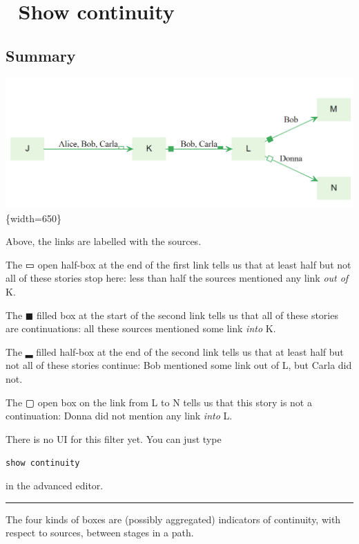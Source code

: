 \documentclass[
]{book}
\begin{document}
\hypertarget{show-continuity}{%
\section{🧪 Show continuity}\label{show-continuity}}

\hypertarget{summary-4}{%
\subsection{Summary}\label{summary-4}}

\includegraphics[width=6.77083in,height=\textheight]{_assets/image-20211222121147473.png}\{width=650\}

Above, the links are labelled with the sources.

The ▭ open half-box at the end of the first link tells us that at least half but not all of these stories stop here: less than half the sources mentioned any link \emph{out of} K.

The ◼ filled box at the start of the second link tells us that all of these stories are continuations: all these sources mentioned some link \emph{into} K.

The ▂ filled half-box at the end of the second link tells us that at least half but not all of these stories continue: Bob mentioned some link out of L, but Carla did not.

The ▢ open box on the link from L to N tells us that this story is not a continuation: Donna did not mention any link \emph{into} L.

There is no UI for this filter yet. You can just type

\texttt{show\ continuity}

in the advanced editor.

\begin{center}\rule{0.5\linewidth}{0.5pt}\end{center}

The four kinds of boxes are (possibly aggregated) indicators of continuity, with respect to sources, between stages in a path.
\end{document}
